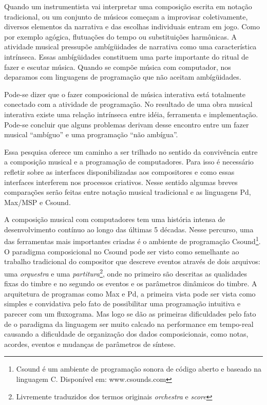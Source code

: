\documentclass[draft]{ppgmus}
\begin{document}
Quando um instrumentista
vai interpretar uma composição escrita em notação tradicional, ou um conjunto de 
músicos começam a improvisar coletivamente, diversos elementos da narrativa e 
das escolhas individuais entram em jogo. Como por exemplo agógica, flutuações do tempo ou
 substituições harmônicas. A atividade musical pressupõe ambígüidades de narrativa como
uma característica intrínseca.
Essas ambígüidades constituem uma parte importante do ritual de fazer
e escutar música. Quando se compõe música com computador, nos
deparamos com linguagens de programação que não aceitam ambígüidades.

Pode-se dizer que o fazer composicional de música interativa está 
totalmente conectado com a atividade de programação. No resultado de uma
obra musical interativa existe uma relação intrínseca entre idéia, ferramenta e 
implementação. Pode-se concluir que alguns 
problemas derivam desse encontro entre um fazer musical ``ambíguo'' e uma programação
``não ambígua''. 


Essa pesquisa oferece um caminho a ser trilhado no sentido da convivência
entre a composição musical e a programação de computadores.
Para isso é necessário refletir sobre as interfaces disponibilizadas
aos compositores e como essas interfaces interferem nos processos criativos.
Nesse sentido algumas breves comparações serão feitas entre notação musical
tradicional e as linguagens Pd, Max/MSP e Csound.

A composição musical com computadores tem uma história intensa de desenvolvimento
contínuo ao longo das últimas 5 décadas. Nesse percurso, uma das ferramentas mais
importantes criadas é o ambiente de programação Csound\footnote{Csound é um ambiente de programação
sonora de código aberto e baseado na linguagem C. Disponível em: www.csounds.com}.
O paradigma composicional no Csound pode ser visto como semelhante ao
trabalho tradicional do compositor que descreve eventos através de
dois arquivos: uma \textit{orquestra} e uma \textit{partitura}\footnote{Livremente traduzidos
dos termos originais \textit{orchestra} e \textit{score}}, onde no primeiro são
descritas as qualidades fixas do timbre e no segundo os eventos e os
parâmetros dinâmicos do timbre. A arquitetura de programas como Max e
Pd, a primeira vista pode ser vista como simples e convidativa pelo
fato de possibilitar uma programação intuitiva e parecer com um
fluxograma. Mas logo se dão as primeiras dificuldades pelo fato de o
paradigma da linguagem ser muito calcado na performance em tempo-real
causando a dificuldade de organização dos dados composicionais, como
notas, acordes, eventos e mudanças de parâmetros de síntese.
\end{document}
